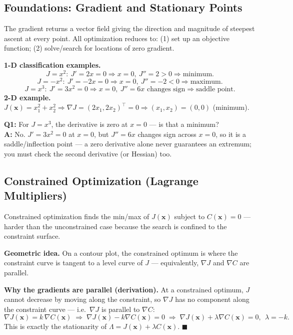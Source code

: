 \subsection{Foundations: Gradient and Stationary Points}

\begin{defbox}
The gradient returns a vector field giving the direction and magnitude of steepest ascent at every point. All optimization reduces to: (1) set up an objective function; (2) solve/search for locations of zero gradient.
\end{defbox}

\begin{examplebox}
\textbf{1-D classification examples.}
\[
J=x^2:\ J'=2x=0\Rightarrow x=0,\ J''=2>0 \Rightarrow \text{minimum}.
\]
\[
J=-x^2:\ J'=-2x=0\Rightarrow x=0,\ J''=-2<0 \Rightarrow \text{maximum}.
\]
\[
J=x^3:\ J'=3x^2=0\Rightarrow x=0,\ J''=6x \text{ changes sign} \Rightarrow \text{saddle point}.
\]
\textbf{2-D example.} $J(\mathbf x)=x_1^2+x_2^2 \Rightarrow \nabla J = (2x_1,2x_2)^\top = 0 \Rightarrow (x_1,x_2)=(0,0)$ (minimum).
\end{examplebox}

\begin{qabox}
\textbf{Q1:} For $J=x^3$, the derivative is zero at $x=0$ — is that a minimum? \\
\textbf{A:} No. $J'=3x^2=0$ at $x=0$, but $J''=6x$ changes sign across $x=0$, so it is a saddle/inflection point — a zero derivative alone never guarantees an extremum; you must check the second derivative (or Hessian) too.
\end{qabox}

\subsection{Constrained Optimization (Lagrange Multipliers)}

\begin{defbox}
Constrained optimization finds the min/max of $J(\mathbf x)$ subject to $C(\mathbf x)=0$ — harder than the unconstrained case because the search is confined to the constraint surface.
\end{defbox}

\textbf{Geometric idea.} On a contour plot, the constrained optimum is where the constraint curve is tangent to a level curve of $J$ — equivalently, $\nabla J$ and $\nabla C$ are parallel.

\begin{examplebox}
\textbf{Why the gradients are parallel (derivation).} At a constrained optimum, $J$ cannot decrease by moving along the constraint, so $\nabla J$ has no component along the constraint curve — i.e.\ $\nabla J$ is parallel to $\nabla C$:
\[
\nabla J(\mathbf x) = k\,\nabla C(\mathbf x) \;\Longrightarrow\; \nabla J(\mathbf x) - k\nabla C(\mathbf x)=0 \;\Longrightarrow\; \nabla J(\mathbf x)+\lambda \nabla C(\mathbf x)=0,\ \ \lambda=-k.
\]
This is exactly the stationarity of $\Lambda = J(\mathbf x)+\lambda C(\mathbf x)$. $\blacksquare$
\end{examplebox}

